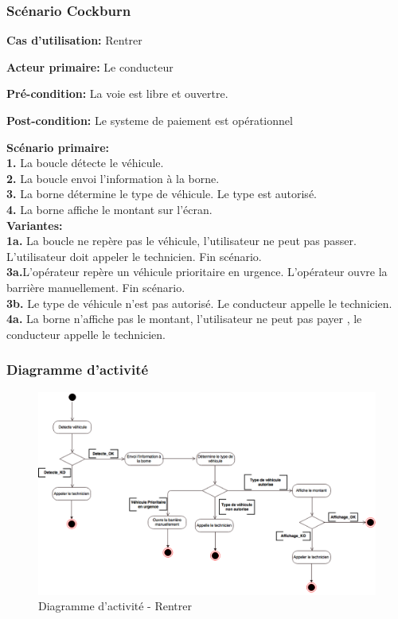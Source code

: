 \subsubsection{Scénario Cockburn}
\textbf{Cas d'utilisation: }Rentrer

\textbf{Acteur primaire:} Le conducteur

\textbf{Pré-condition: } La voie est libre et ouvertre.
 
\textbf{Post-condition: } Le systeme de paiement est opérationnel


\textbf{Scénario primaire: } \\
    \textbf{1.} La boucle détecte le véhicule.\\
    \textbf{2.} La boucle envoi l’information à la borne.\\
    \textbf{3.} La borne détermine le type de véhicule. Le type est autorisé. \\
    \textbf{4.} La borne affiche le montant sur l'écran.\\

\textbf{Variantes:}\\
    \textbf{1a.} La boucle ne repère pas le véhicule, l’utilisateur ne peut pas passer. L’utilisateur doit appeler le technicien. Fin scénario.\\
    \textbf{3a.}L’opérateur repère un véhicule prioritaire en urgence. L’opérateur ouvre la barrière manuellement. Fin scénario. \\
    \textbf{3b.} Le type de véhicule n’est pas autorisé. Le conducteur appelle le technicien.\\
    \textbf{4a.} La borne n’affiche pas le montant, l’utilisateur ne peut pas payer , le conducteur appelle le technicien.\\
\newpage    
\subsubsection{Diagramme d'activité}
\begin{figure}[!htb]
    \centering
    \includegraphics[scale=0.45, angle = 90]{02_Desenvolvimento/TD2/images/DARentrer.png}
    \caption{Diagramme d'activité - Rentrer}
    \label{fig:DARentrer}
\end{figure}
\newpage
